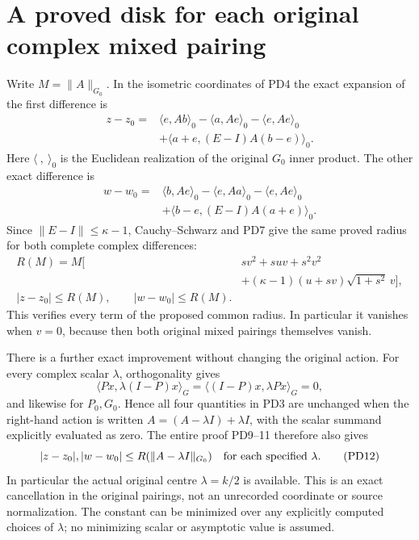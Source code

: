 \section{A proved disk for each original complex mixed pairing}
Write $M=\|A\|_{G_0}$.  In the isometric coordinates of PD4 the
exact expansion of the first difference is
\[
 \begin{split}
 z-z_0={}&\langle e,Ab\rangle_0-\langle a,Ae\rangle_0
              -\langle e,Ae\rangle_0\\
          &+\langle a+e,(E-I)A(b-e)\rangle_0.
 \end{split}                                                      \tag{PD9}
\]
Here $\langle\ ,\ \rangle_0$ is the Euclidean realization of
the original $G_0$ inner product.  The other exact difference is
\[
 \begin{split}
 w-w_0={}&\langle b,Ae\rangle_0-\langle e,Aa\rangle_0
              -\langle e,Ae\rangle_0\\
          &+\langle b-e,(E-I)A(a+e)\rangle_0.
 \end{split}                                                      \tag{PD10}
\]
Since $\|E-I\|\le\kappa-1$, Cauchy--Schwarz and PD7 give the
same proved radius for both complete complex differences:
\[
 \begin{split}
 R(M) =M\bigl[&s v^2+suv+s^2v^2\\
                &+(\kappa-1)(u+sv)\sqrt{1+s^2}\,v\bigr],\\
 \boxed{|z-z_0|\le R(M),\qquad |w-w_0|\le R(M).}
 \end{split}                                                      \tag{PD11}
\]
This verifies every term of the proposed common radius.  In
particular it vanishes when $v=0$, because then both original
mixed pairings themselves vanish.

There is a further exact improvement without changing the original
action.  For every complex scalar $\lambda$, orthogonality gives
\[
 \langle Px,\lambda(I-P)x\rangle_G
 =\langle(I-P)x,\lambda Px\rangle_G=0,
\]
and likewise for $P_0,G_0$.  Hence all four quantities in PD3
are unchanged when the right-hand action is written
$A=(A-\lambda I)+\lambda I$, with the scalar summand explicitly
evaluated as zero.  The entire proof PD9--11 therefore also gives
\[
 |z-z_0|,|w-w_0|\le R(\|A-\lambda I\|_{G_0})
                  \quad\hbox{for each specified }\lambda.       \tag{PD12}
\]
In particular the actual original centre $\lambda=k/2$ is available.
This is an exact cancellation in the original pairings, not an
unrecorded coordinate or source normalization.  The constant can
be minimized over any explicitly computed choices of $\lambda$;
no minimizing scalar or asymptotic value is assumed.

